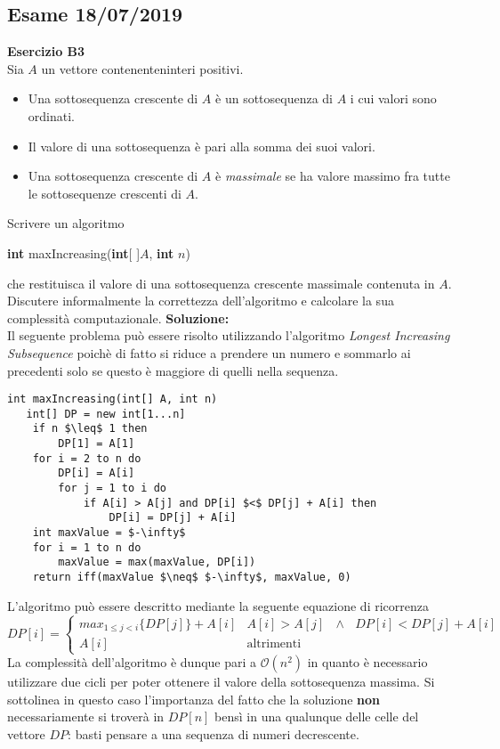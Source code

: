 \documentclass[../cheatSheetAlgoritmi.tex]{subfiles}
\begin{document}
\subsection{Esame 18/07/2019}
\textbf{Esercizio B3}\\
Sia $A$ un vettore contenenteninteri positivi.
\begin{itemize}
	\item Una sottosequenza crescente di $A$ è un sottosequenza di $A$ i cui valori sono ordinati.
	\item Il valore di una sottosequenza è pari alla somma dei suoi valori.
	\item Una sottosequenza crescente di $A$ è \emph{massimale} se ha valore massimo fra tutte le sottosequenze crescenti di $A$.
\end{itemize}
Scrivere un algoritmo 
\begin{center}
	\textbf{int} maxIncreasing(\textbf{int}[ ]$A$, \textbf{int} $n$)
\end{center}
che  restituisca  il valore di  una  sottosequenza  crescente massimale contenuta in $A$. Discutere  informalmente  la  correttezza  dell’algoritmo  e calcolare la sua complessità computazionale.
\textbf{Soluzione:}\\
Il seguente problema può essere risolto utilizzando l'algoritmo \emph{Longest Increasing Subsequence} poichè di fatto si riduce a prendere un numero e sommarlo ai precedenti solo se questo è maggiore di quelli nella sequenza.
\begin{lstlisting}[caption=Longest Increasing Subsequence]
int maxIncreasing(int[] A, int n)
   int[] DP = new int[1...n]
   	if n $\leq$ 1 then
   		DP[1] = A[1]
	for i = 2 to n do
		DP[i] = A[i]
		for j = 1 to i do
			if A[i] > A[j] and DP[i] $<$ DP[j] + A[i] then
				DP[i] = DP[j] + A[i]
	int maxValue = $-\infty$
	for i = 1 to n do
		maxValue = max(maxValue, DP[i])
	return iff(maxValue $\neq$ $-\infty$, maxValue, 0)
\end{lstlisting}
L'algoritmo può essere descritto mediante la seguente equazione di ricorrenza
\begin{equation*}
  	DP[i]=\begin{cases}
    	max_{1 \leq j < i}\{DP[j]\} + A[i] & \text{$A[i] > A[j]$ $\land$ $DP[i] < DP[j] + A[i]  $}\\
    	A[i] & \text{altrimenti}
  	\end{cases}
\end{equation*}
La complessità dell'algoritmo è dunque pari a $\mathcal{O}(n^{2})$ in quanto è necessario utilizzare due cicli per poter ottenere il valore della sottosequenza massima. Si sottolinea in questo caso l'importanza del fatto che la soluzione \textbf{non} necessariamente si troverà in $DP[n]$ bensì in una qualunque delle celle del vettore $DP$: basti pensare a una sequenza di numeri decrescente.\\
\end{document}
